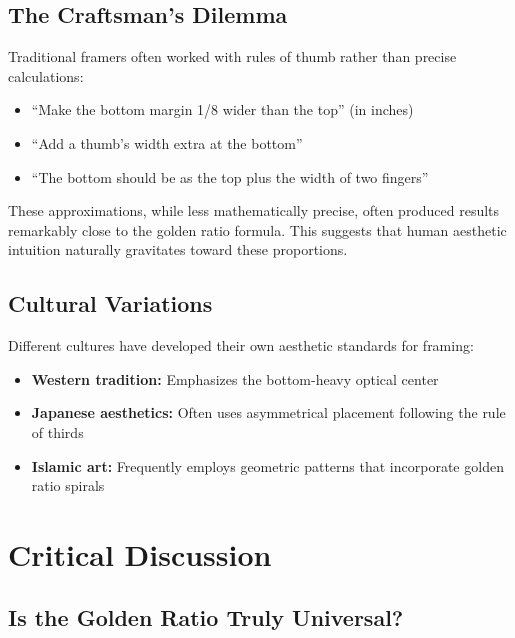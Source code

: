 \documentclass[12pt,a4paper]{article}
\begin{document}
\subsection{The Craftsman's Dilemma}

Traditional framers often worked with rules of thumb rather than precise calculations:

\begin{itemize}
    \item ``Make the bottom margin 1/8 wider than the top'' (in inches)
    \item ``Add a thumb's width extra at the bottom''
    \item ``The bottom should be as the top plus the width of two fingers''
\end{itemize}

These approximations, while less mathematically precise, often produced results remarkably close to the golden ratio formula. This suggests that human aesthetic intuition naturally gravitates toward these proportions.

\subsection{Cultural Variations}

Different cultures have developed their own aesthetic standards for framing:

\begin{itemize}
    \item \textbf{Western tradition:} Emphasizes the bottom-heavy optical center
    \item \textbf{Japanese aesthetics:} Often uses asymmetrical placement following the rule of thirds
    \item \textbf{Islamic art:} Frequently employs geometric patterns that incorporate golden ratio spirals
\end{itemize}

\section{Critical Discussion}

\subsection{Is the Golden Ratio Truly Universal?}
\end{document}
